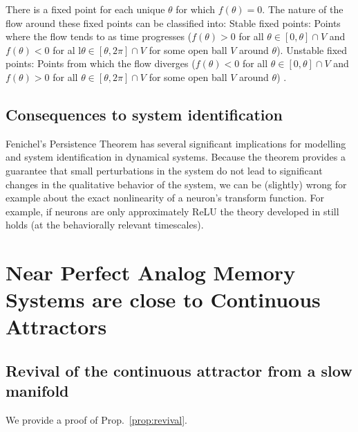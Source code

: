 \documentclass{article} %
\newcounter{ct}
\theoremstyle{definition}
\theoremstyle{remark}
\begin{document}
There is a fixed point for each unique \(\theta\) for which \(f(\theta)=0\). The nature of the flow around these fixed points can be classified into:
Stable fixed points: Points where the flow tends to as time progresses (\(f(\theta)>0\) for all \( \theta\in[0,\theta]\cap V\) and \(f(\theta)<0\) for al l\( \theta\in[\theta,2\pi]\cap V\) for some open ball \(V\) around \(\theta\)).
Unstable fixed points: Points from which the flow diverges (\(f(\theta)<0\) for all \( \theta\in[0,\theta]\cap V\) and \(f(\theta)>0\) for all \( \theta\in[\theta,2\pi]\cap V\) for some open ball \(V\) around \(\theta\)) .


\subsection{Consequences to system identification}
Fenichel's Persistence Theorem has several significant implications for modelling and system identification in dynamical systems.
Because the theorem provides a guarantee that small perturbations in the system do not lead to significant changes in the qualitative behavior of the system,
we can be (slightly) wrong for example about the exact nonlinearity of a neuron's transform function.
For example, if neurons are only approximately ReLU the theory developed in \citep{biswas2022geometric} still holds (at the behaviorally relevant timescales).




\newpage
\section{Near Perfect Analog Memory Systems are close to Continuous Attractors}
\subsection{Revival of the continuous attractor from a slow manifold}\label{sec:supp:proofprop1}

 We  provide a proof of Prop.~\ref{prop:revival}.
\end{document}
